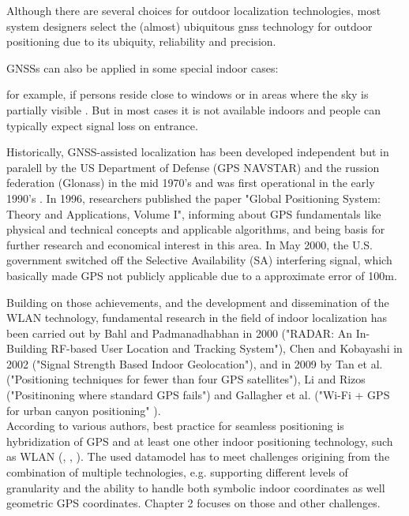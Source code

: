 
Although there are several choices for outdoor localization technologies, most system designers select the (almost) ubiquitous \ac{gnss} technology for outdoor positioning due to its ubiquity, reliability and precision. 

GNSSs can also be applied in some special indoor cases:

for example, if persons reside close to windows or in areas where the sky is partially visible \cite{gpsIndoorsMoeglich}. But in most cases it is not available indoors and people can typically expect signal loss on entrance.

Historically, GNSS-assisted localization has been developed independent but in paralell by the US Department of Defense (GPS NAVSTAR) and the russion federation (Glonass) in the mid 1970's and was first operational in the early 1990's . %
In 1996, researchers published the paper "Global Positioning System: Theory and Applications, Volume I", informing about GPS fundamentals like physical and technical concepts and applicable algorithms, and being basis for further research and economical interest in this area. In May 2000, the U.S. government switched off the Selective Availability (SA) interfering signal, which basically made GPS not publicly applicable due to a approximate error of 100m.

Building on those achievements, and the development and dissemination of the WLAN technology, fundamental research in the field of indoor localization has been carried out by Bahl and Padmanadhabhan in 2000 ("RADAR: An In-Building RF-based User Location and Tracking System"), Chen and Kobayashi in 2002 ("Signal Strength Based Indoor Geolocation"), and in 2009 by Tan et al. ("Positioning techniques for fewer than four GPS satellites"), Li and Rizos ("Positinoning where standard GPS fails") and Gallagher et al. ("Wi-Fi + GPS for urban canyon positioning" \cite{wifiGPSUrbanCanyon}).\\


According to various authors, best practice for seamless positioning is hybridization of GPS and at least one other indoor positioning technology, such as WLAN (\cite{wifiGPSUrbanCanyon}, \cite{streamspin}, \cite{zeroConfigGPSWLAN}). The used datamodel has to meet challenges origining from the combination of multiple technologies, e.g. supporting different levels of granularity and the ability to handle both symbolic indoor coordinates as well geometric GPS coordinates.
Chapter 2 focuses on those and other challenges.

